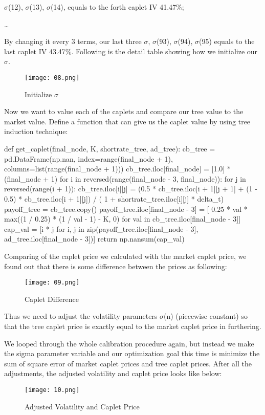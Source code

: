 \documentclass[paper = letterpaper, fontsize=12pt]{article}
\begin{document}
$\sigma$(12),  $\sigma$(13), $\sigma$(14), equals to the forth caplet IV 41.47\%;

…

By changing it every 3 terms, our last three $\sigma$, $\sigma$(93), $\sigma$(94), $\sigma$(95) equals to the last caplet IV 43.47\%. Following is the detail table showing how we initialize our $\sigma$.


\begin{figure}[H]
    \centering
    \texttt{[image: 08.png]}
    \caption{Initialize $\sigma$}
\end{figure}
 


Now we want to value each of the caplets and compare our tree value to the market value. Define a function that can give us the caplet value by using tree induction technique:
\begin{python}
def get_caplet(final_node, K, shortrate_tree, ad_tree):
    cb_tree = pd.DataFrame(np.nan, index=range(final_node + 1),
                           columns=list(range(final_node + 1)))
    cb_tree.iloc[final_node] = [1.0] * (final_node + 1)
    for i in reversed(range(final_node - 3, final_node)):
        for j in reversed(range(i + 1)):
            cb_tree.iloc[i][j] = (0.5 * cb_tree.iloc[i + 1][j + 1] + (1 - 0.5)
                                  * cb_tree.iloc[i + 1][j]) / (
                                     1 + shortrate_tree.iloc[i][j] * delta_t)
    payoff_tree = cb_tree.copy()
    payoff_tree.iloc[final_node - 3] = [
        0.25 * val * max((1 / 0.25) * (1 / val - 1) - K, 0) for val in
        cb_tree.iloc[final_node - 3]]
    cap_val = [i * j for i, j in
               zip(payoff_tree.iloc[final_node - 3],
                   ad_tree.iloc[final_node - 3])]
    return np.nansum(cap_val)
\end{python}


Comparing of the caplet price we calculated with the market caplet price, we found out that there is some difference between the prices as following:
\begin{figure}[H]
    \centering
    \texttt{[image: 09.png]}
    \caption{Caplet Difference}
\end{figure}
 

Thus we need to adjust the volatility parameters $\sigma$(n) (piecewise constant) so that the tree caplet price is exactly equal to the market caplet price in furthering.

We looped through the whole calibration procedure again, but instead we make the sigma parameter variable and our optimization goal this time is minimize the sum of square error of market caplet prices and tree caplet prices. After all the adjustments, the adjusted volatility and caplet price looks like below:
\begin{figure}[H]
    \centering
    \texttt{[image: 10.png]}
    \caption{Adjusted Volatility and Caplet Price}
\end{figure}
\end{document}
